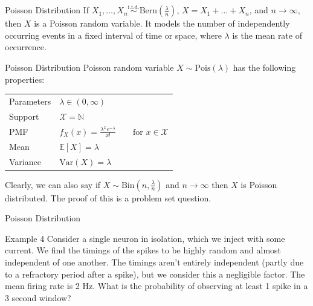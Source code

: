 \documentclass[10pt]{beamer}
\begin{document}
\begin{frame}[fragile]{Poisson Distribution}
If \(X_1, \dots, X_n \overset{\textrm{i.i.d.}}{\sim} \textrm{Bern}\left(\frac{\lambda}{n}\right)\), \(X = X_1 + \dots + X_n\), and \(n \rightarrow \infty\), then \(X\) is a Poisson random variable. It models the number of independently occurring events in a fixed interval of time or space, where \(\lambda\) is the mean rate of occurrence.

\begin{alertblock}{Poisson Distribution}
Poisson random variable \(X \sim \mathrm{Pois}\left(\lambda\right)\) has the following properties:
  \begin{table}
    \begin{tabular}{ll}
      \toprule
      Parameters & \(\lambda \in \left(0, \infty\right)\)\\
      Support & \(\mathcal{X} = \mathbb{N}\)\\
      PMF & \(f_X\left(x\right) = \frac{\lambda^x e^{-\lambda}}{x!}\qquad\textrm{for }x \in \mathcal{X}\)\\
      Mean & \(\mathbb{E}\left[X\right] = \lambda\)\\
      Variance & \(\textrm{Var}\left(X\right) = \lambda\)\\
      \bottomrule
    \end{tabular}
  \end{table}
\end{alertblock}

Clearly, we can also say if \(X \sim \textrm{Bin}\left(n, \frac{\lambda}{n}\right)\) and \(n \rightarrow \infty\) then \(X\) is Poisson distributed. The proof of this is a problem set question.
\end{frame}

\begin{frame}[fragile]{Poisson Distribution}
\begin{exampleblock}{Example 4}
Consider a single neuron in isolation, which we inject with some current. We find the timings of the spikes to be highly random and almost independent of one another. The timings aren't entirely independent (partly due to a refractory period after a spike), but we consider this a negligible factor. The mean firing rate is 2 Hz. What is the probability of observing at least 1 spike in a 3 second window?
\end{exampleblock}
\end{frame}
\end{document}
